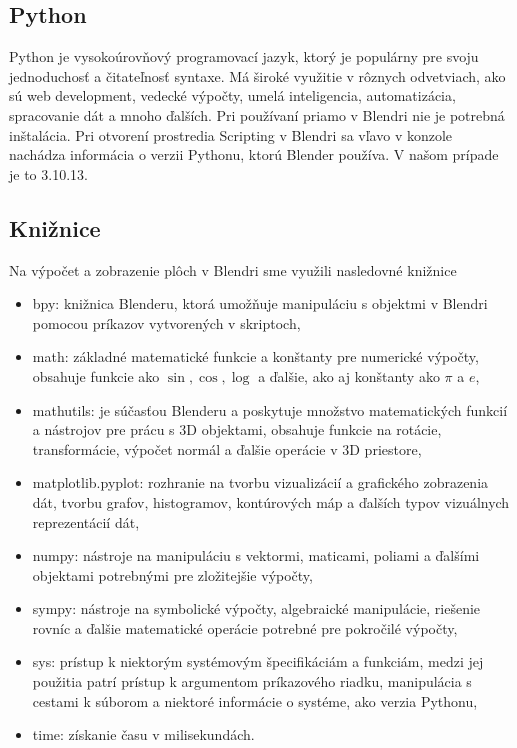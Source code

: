 \subsection{Python}
Python je vysokoúrovňový programovací jazyk, ktorý je populárny pre svoju jednoduchosť a čitateľnosť syntaxe. Má široké využitie v rôznych odvetviach, ako sú web development, vedecké výpočty, umelá inteligencia, automatizácia, spracovanie dát a mnoho ďalších. Pri používaní priamo v Blendri nie je potrebná inštalácia. Pri otvorení prostredia Scripting v Blendri sa vľavo v konzole nachádza informácia o verzii Pythonu, ktorú Blender používa. V našom prípade je to 3.10.13.
\subsection{Knižnice}
Na výpočet a zobrazenie plôch v Blendri sme využili nasledovné knižnice
\begin{itemize}
\item bpy: knižnica Blenderu, ktorá umožňuje manipuláciu s objektmi v Blendri pomocou príkazov vytvorených v skriptoch,
\item math: základné matematické funkcie a konštanty pre numerické výpočty, obsahuje funkcie ako $\sin, \cos, \log$ a ďalšie, ako aj konštanty ako $\pi$ a $e$,
\item mathutils: je súčasťou Blenderu a poskytuje množstvo matematických funkcií a nástrojov pre prácu s 3D objektami, obsahuje funkcie na rotácie, transformácie, výpočet normál a ďalšie operácie v 3D priestore,
\item matplotlib.pyplot: rozhranie na tvorbu vizualizácií a grafického zobrazenia dát, tvorbu grafov, histogramov, kontúrových máp a ďalších typov vizuálnych reprezentácií dát,
\item numpy: nástroje na manipuláciu s vektormi, maticami, poliami a ďalšími objektami potrebnými pre zložitejšie výpočty,
\item sympy: nástroje na symbolické výpočty, algebraické manipulácie, riešenie rovníc a ďalšie matematické operácie potrebné pre pokročilé výpočty,
\item sys: prístup k niektorým systémovým špecifikáciám a funkciám, medzi jej použitia patrí prístup k argumentom príkazového riadku, manipulácia s cestami k súborom a niektoré informácie o systéme, ako verzia Pythonu,
\item time: získanie času v milisekundách. 
\end{itemize}
